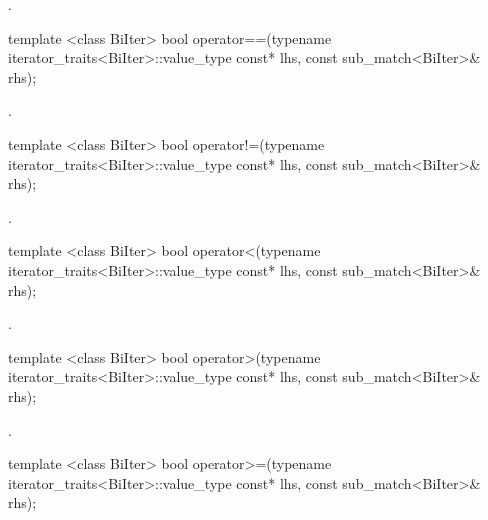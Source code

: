 \begin{itemdescr}
\pnum\returns {}.
\end{itemdescr}

%
\begin{itemdecl}
template <class BiIter> 
  bool operator==(typename iterator_traits<BiIter>::value_type const* lhs, 
                  const sub_match<BiIter>& rhs); 
\end{itemdecl}

\begin{itemdescr}
\pnum\returns {}.
\end{itemdescr}

%
\begin{itemdecl}
template <class BiIter> 
  bool operator!=(typename iterator_traits<BiIter>::value_type const* lhs, 
                  const sub_match<BiIter>& rhs); 
\end{itemdecl}

\begin{itemdescr}
\pnum\returns {}.
\end{itemdescr}

%
\begin{itemdecl}
template <class BiIter> 
  bool operator<(typename iterator_traits<BiIter>::value_type const* lhs, 
                 const sub_match<BiIter>& rhs); 
\end{itemdecl}

\begin{itemdescr}
\pnum\returns {}.
\end{itemdescr}

%
\begin{itemdecl}
template <class BiIter> 
  bool operator>(typename iterator_traits<BiIter>::value_type const* lhs, 
                 const sub_match<BiIter>& rhs); 
\end{itemdecl}

\begin{itemdescr}
\pnum\returns {}.
\end{itemdescr}

%
\begin{itemdecl}
template <class BiIter> 
  bool operator>=(typename iterator_traits<BiIter>::value_type const* lhs, 
                  const sub_match<BiIter>& rhs); 
\end{itemdecl}

